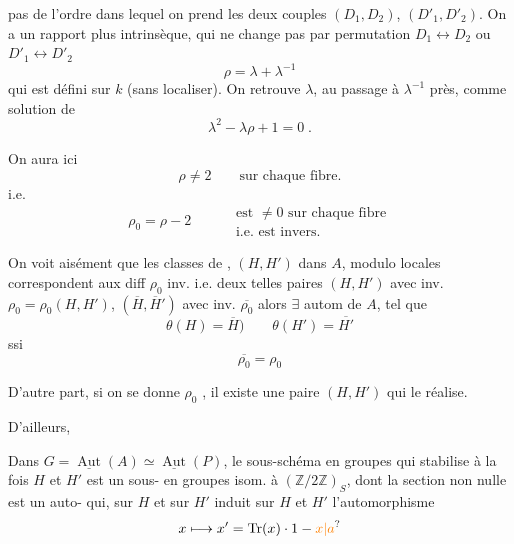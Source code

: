 pas de l'ordre dans lequel on prend les deux  couples $(D_1,D_2)$, $(D'_1,D'_2)$. On a un rapport plus intrinsèque, qui ne change pas par permutation $D_1\leftrightarrow D_2$ ou $D'_1\leftrightarrow D'_2$
\[
\rho=\lambda+\lambda^{-1}
\]
qui est défini sur $k$ (sans localiser). On retrouve $\lambda$, au passage à $\lambda^{-1}$ près, comme solution de
\[
\lambda^2-\lambda\rho+1=0\;.
\]

 On aura ici
\[
\rho\ne 2\qquad\text{sur chaque fibre.}
\]
i.e.
\[
\rho_0=\rho-2\qquad\begin{aligned}&\text{est $\ne0$ sur chaque fibre}\\[-2pt]&\text{i.e. est invers.}\end{aligned}
\]

On voit  aisément que les classes de ,  $(H,H')$ dans $A$,  modulo  locales correspondent aux diff $\rho_0$ inv. i.e.  deux telles paires $(H,H')$ avec inv. $\rho_0=\rho_0(H,H')$, $(\overline H,\overline H')$ avec inv. $\overline{\rho_0}$
alors $\exists$  autom \inserted{$\theta$} de $A$, tel que
\[
\theta(H)=\overline H)\qquad\theta(H')=\overline{H'}
\]
ssi
\[
\overline{\rho_0}=\rho_0
\]

D'autre part, si on se donne $\rho_0$ ,  il existe \uline{} une paire $(H,H')$ qui le réalise.

D'ailleurs, 

 Dans $G=\underline{\operatorname{Aut}}(A)\simeq\underline{\operatorname{Aut}}(P)$, le sous-schéma en groupes qui stabilise à la fois $H$ et $H'$ est un sous-
 en groupes isom. à $(\mathbb Z/2\mathbb Z)_S$,  dont la section non nulle est un auto- qui, sur $H$ et sur $H'$ 
induit sur $H$ et $H'$ l'automorphisme
\[
x\longmapsto x'=\operatorname{Tr}(x)\cdot1-\unsure{x|a}
\]

